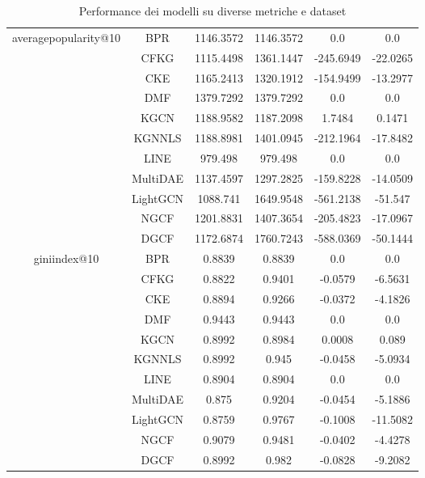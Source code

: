\begin{table}[H]
{\begin{tabular}{|c|c|c|c|c|c|}
            \multirow{11}{*}{averagepopularity@10} 
                & BPR & 1146.3572 & 1146.3572 & 0.0 & 0.0 \\ \cline{2-6} 
                & CFKG & 1115.4498 & 1361.1447 & -245.6949 & -22.0265 \\ \cline{2-6} 
                & CKE & 1165.2413 & 1320.1912 & -154.9499 & -13.2977 \\ \cline{2-6} 
                & DMF & 1379.7292 & 1379.7292 & 0.0 & 0.0 \\ \cline{2-6} 
                & KGCN & 1188.9582 & 1187.2098 & 1.7484 & 0.1471 \\ \cline{2-6} 
                & KGNNLS & 1188.8981 & 1401.0945 & -212.1964 & -17.8482 \\ \cline{2-6} 
                & LINE & 979.498 & 979.498 & 0.0 & 0.0 \\ \cline{2-6} 
                & MultiDAE & 1137.4597 & 1297.2825 & -159.8228 & -14.0509 \\ \cline{2-6} 
                & LightGCN & 1088.741 & 1649.9548 & -561.2138 & -51.547 \\ \cline{2-6} 
                & NGCF & 1201.8831 & 1407.3654 & -205.4823 & -17.0967 \\ \cline{2-6} 
                & DGCF & 1172.6874 & 1760.7243 & -588.0369 & -50.1444 \\ \hline

            \multirow{11}{*}{giniindex@10} 
                & BPR & 0.8839 & 0.8839 & 0.0 & 0.0 \\ \cline{2-6} 
                & CFKG & 0.8822 & 0.9401 & -0.0579 & -6.5631 \\ \cline{2-6} 
                & CKE & 0.8894 & 0.9266 & -0.0372 & -4.1826 \\ \cline{2-6} 
                & DMF & 0.9443 & 0.9443 & 0.0 & 0.0 \\ \cline{2-6} 
                & KGCN & 0.8992 & 0.8984 & 0.0008 & 0.089 \\ \cline{2-6} 
                & KGNNLS & 0.8992 & 0.945 & -0.0458 & -5.0934 \\ \cline{2-6} 
                & LINE & 0.8904 & 0.8904 & 0.0 & 0.0 \\ \cline{2-6} 
                & MultiDAE & 0.875 & 0.9204 & -0.0454 & -5.1886 \\ \cline{2-6} 
                & LightGCN & 0.8759 & 0.9767 & -0.1008 & -11.5082 \\ \cline{2-6} 
                & NGCF & 0.9079 & 0.9481 & -0.0402 & -4.4278 \\ \cline{2-6} 
                & DGCF & 0.8992 & 0.982 & -0.0828 & -9.2082 \\ \hline
        \end{tabular}
    }
    \caption{Performance dei modelli su diverse metriche e dataset}
\end{table}



